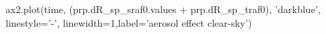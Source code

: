     ax2.plot(time, (prp.dR_sp_sraf0.values + prp.dR_sp_traf0), 'darkblue', linestyle='-', linewidth=1,label='aerosol effect clear-sky')